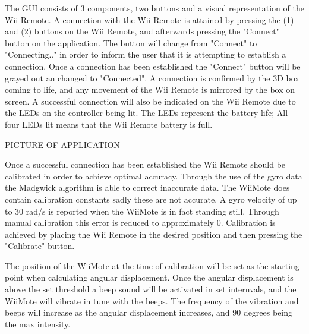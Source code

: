 The GUI consists of 3 components, two buttons and a visual representation of the Wii Remote. A connection with the Wii Remote is attained by pressing the (1) and (2) buttons on the Wii Remote, and afterwards pressing the "Connect" button on the application. The button will change from "Connect" to "Connecting.." in order to inform the user that it is attempting to establish a connection. Once a connection has been established the "Connect" button will be grayed out an changed to "Connected". A connection is confirmed by the 3D box coming to life, and any movement of the Wii Remote is mirrored by the box on screen. A successful connection will also be indicated on the Wii Remote due to the LEDs on the controller being lit. The LEDs represent the battery life; All four LEDs lit means that the Wii Remote battery is full.

PICTURE OF APPLICATION

Once a successful connection has been established the Wii Remote should be calibrated in order to achieve optimal accuracy. Through the use of the gyro data the Madgwick algorithm is able to correct inaccurate data. The WiiMote does contain calibration constants sadly these are not accurate. A gyro velocity of up to 30 rad/s is reported when the WiiMote is in fact standing still. Through manual calibration this error is reduced to approximately 0. Calibration is achieved by placing the Wii Remote in the desired position and then pressing the "Calibrate" button.

The position of the WiiMote at the time of calibration will be set as the starting point when calculating angular displacement. Once the angular displacement is above the set threshold a beep sound will be activated in set internvals, and the WiiMote will vibrate in tune with the beeps. The frequency of the vibration and beeps will increase as the angular displacement increases, and 90 degrees being the max intensity.
